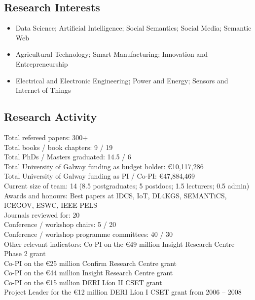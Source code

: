 \documentclass[10pt,a4paper]{res} %
\begin{document}
\begin{resume}
\subsection*{Research Interests}

\begin{itemize} \itemsep -2pt
\item Data Science; Artificial Intelligence; Social Semantics; Social Media; Semantic Web
\item Agricultural Technology; Smart Manufacturing; Innovation and Entrepreneurship
\item Electrical and Electronic Engineering; Power and Energy; Sensors and Internet of Things
\end{itemize}

\subsection*{Research Activity}

\begin{center}
Total refereed papers: \hfill 300+ \\ %
Total books / book chapters: \hfill 9 / 19 \\ %
Total PhDs / Masters graduated: \hfill 14.5 / 6 \\
Total University of Galway funding as budget holder: \hfill \euro{}10,117,286 \\
Total University of Galway funding as PI / Co-PI: \hfill \euro{}47,884,469 \\
Current size of team: \hfill 14 (8.5 postgraduates; 5 postdocs; 1.5 lecturers; 0.5 admin) \\
Awards and honours: \hfill Best papers at IDCS, IoT, DL4KGS, SEMANTiCS, ICEGOV, ESWC, IEEE PELS \\
Journals reviewed for: \hfill 20 \\
Conference / workshop chairs: \hfill 5 / 20 \\
Conference / workshop programme committees: \hfill 40 / 30 \\
Other relevant indicators: \hfill Co-PI on the \euro{}49 million Insight Research Centre Phase 2 grant \\ \hfill Co-PI on the \euro{}25 million Confirm Research Centre grant \\ \hfill Co-PI on the \euro{}44 million Insight Research Centre grant \\ \hfill Co-PI on the \euro{}15 million DERI L\'{i}on II CSET grant \\ \hfill Project Leader for the \euro{}12 million DERI L\'{i}on I CSET grant from 2006 -- 2008
\end{center}


\end{resume}
\end{document}
